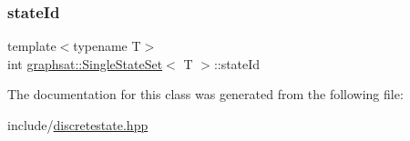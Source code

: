 \subsubsection{\texorpdfstring{stateId}{stateId}}
{\footnotesize\ttfamily template$<$typename T$>$ \\
int \mbox{\hyperlink{classgraphsat_1_1_single_state_set}{graphsat\+::\+Single\+State\+Set}}$<$ T $>$\+::state\+Id\hspace{0.3cm}{\ttfamily [protected]}}



The documentation for this class was generated from the following file\+:\begin{DoxyCompactItemize}
\item 
include/\mbox{\hyperlink{discretestate_8hpp}{discretestate.\+hpp}}\end{DoxyCompactItemize}
